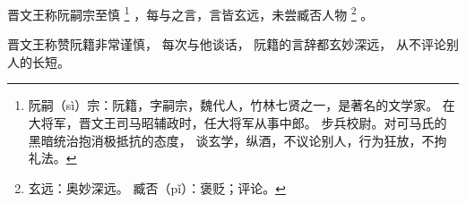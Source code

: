 
\switchcolumn*[\section{}]

晋文王称阮嗣宗至慎%
\footnote{%
    阮嗣（sì）宗：阮籍，字嗣宗，魏代人，竹林七贤之一，是著名的文学家。
                  在大将军，晋文王司马昭辅政时，任大将军从事中郎。
                  步兵校尉。对可马氏的黑暗统治抱消极抵抗的态度，
                  谈玄学，纵酒，不议论别人，行为狂放，不拘礼法。
}%
，每与之言，言皆玄远，未尝臧否人物%
\footnote{%
    玄远：奥妙深远。
    臧否（pǐ）：褒贬；评论。
}%
。

\switchcolumn

晋文王称赞阮籍非常谨慎，
每次与他谈话，
阮籍的言辞都玄妙深远，
从不评论别人的长短。
